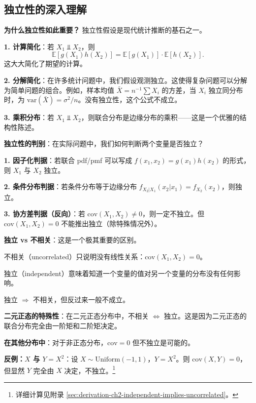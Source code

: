 
\subsection{独立性的深入理解}

\textbf{为什么独立性如此重要？} 独立性假设是现代统计推断的基石之一。

\textbf{1. 计算简化}：若 $X_1 \Perp X_2$，则
\[
\mathbb{E}[g(X_1)h(X_2)] = \mathbb{E}[g(X_1)] \cdot \mathbb{E}[h(X_2)].
\]
这大大简化了期望的计算。

\textbf{2. 分解简化}：在许多统计问题中，我们假设观测独立。这使得复杂问题可以分解为简单问题的组合。例如，样本均值 $\bar{X} = n^{-1}\sum X_i$ 的方差，当 $X_i$ 独立同分布时，为 $\text{var}(\bar{X}) = \sigma^2/n$。没有独立性，这个公式不成立。

\textbf{3. 乘积分布}：若 $X_1 \Perp X_2$，则联合分布是边缘分布的乘积——这是一个优雅的结构性陈述。

\textbf{独立性的判别}：在实际问题中，我们如何判断两个变量是否独立？

\textbf{1. 因子化判据}：若联合 pdf/pmf 可以写成 $f(x_1, x_2) = g(x_1)h(x_2)$ 的形式，则 $X_1$ 与 $X_2$ 独立。

\textbf{2. 条件分布判据}：若条件分布等于边缘分布 $f_{X_2|X_1}(x_2|x_1) = f_{X_2}(x_2)$，则独立。

\textbf{3. 协方差判据（反向）}：若 $\text{cov}(X_1, X_2) \neq 0$，则一定不独立。但 $\text{cov}(X_1, X_2) = 0$ 不能推出独立（除特殊情况外）。

\textbf{独立 vs 不相关}：这是一个极其重要的区别。

不相关（uncorrelated）只说明没有线性关系：$\text{cov}(X_1, X_2) = 0$。

独立（independent）意味着知道一个变量的值对另一个变量的分布没有任何影响。

独立 $\Rightarrow$ 不相关，但反过来一般不成立。

\textbf{二元正态的特殊性}：在二元正态分布中，不相关 $\iff$ 独立。这是因为二元正态的联合分布完全由一阶矩和二阶矩决定。

\textbf{在其他分布中}：对于非正态分布，$\text{cov} = 0$ 但不独立是可能的。

\textbf{反例：$X$ 与 $Y = X^2$}：设 $X \sim \text{Uniform}(-1, 1)$，$Y = X^2$。则 $\text{cov}(X, Y) = 0$，但显然 $Y$ 完全由 $X$ 决定，不独立。\footnote{详细计算见附录 \cref{sec:derivation-ch2-independent-implies-uncorrelated}。}

